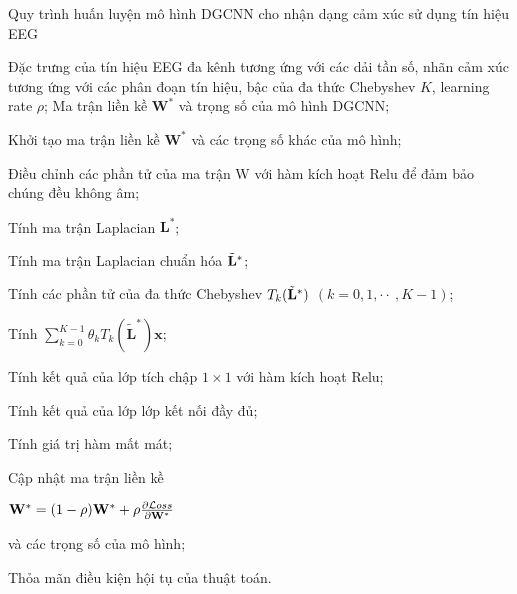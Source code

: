 \documentclass{article}
\makeatletter
\newcommand{\StatePar}[1]{%
  \State\parbox[t]{\dimexpr\linewidth-\ALG@thistlm}{\strut #1\strut}%
}
\let\oldState\State
\renewcommand{\State}{\oldState\strut}
\makeatother
\begin{document}
\begin{algorithm}

\caption{Quy trình huấn luyện mô hình DGCNN cho nhận dạng cảm xúc sử dụng tín hiệu EEG}\label{alg:cap}
\begin{algorithmic}[1]
\Require Đặc trưng của tín hiệu EEG đa kênh tương ứng với các dải tần số, nhãn cảm xúc tương ứng với các phân đoạn tín hiệu, bậc của đa thức Chebyshev $K$, learning rate $\rho$;
\Ensure  Ma trận liền kề $\mathbf{W}^{*}$ và trọng số của mô hình DGCNN;
\State Khởi tạo ma trận liền kề $\mathbf{W}^{*}$ và các trọng số khác của mô hình;


\Repeat
\StatePar{Điều chỉnh các phần tử của ma trận W với hàm kích hoạt Relu để đảm bảo chúng đều không âm;}
\StatePar{Tính ma trận Laplacian $\mathbf{L}^{*}$;}
\StatePar{Tính ma trận Laplacian chuẩn hóa ${\tilde{\bf L}}^{*}$;}
\StatePar{Tính các phần tử của đa thức Chebyshev $T_{k}({\tilde{\bf L}}^{*})$ $(k=0,1,\cdot\cdot\ ,K-1)$;}
\StatePar{Tính $\sum_{{k}=0}^{K-1}\theta_{k}T_{k}({\mathbf{\tilde{{L}}}^{*}})\mathbf{x}$;}
\StatePar{Tính kết quả của lớp tích chập $1\times1$ với hàm kích hoạt Relu;}
\StatePar{Tính kết quả của lớp lớp kết nối đầy đủ;}
\StatePar{Tính giá trị hàm mất mát;}
\StatePar{Cập nhật ma trận liền kề \newline \centerline{${\bf W}^{*}=(1-\rho){\bf W}^{*}+\rho\frac{\partial{\cal L}o s s}{\partial{\bf W}^{*}}$} \newline và các trọng số của mô hình;}

\Until Thỏa mãn điều kiện hội tụ của thuật toán.

\end{algorithmic}
\end{algorithm}
\end{document}
